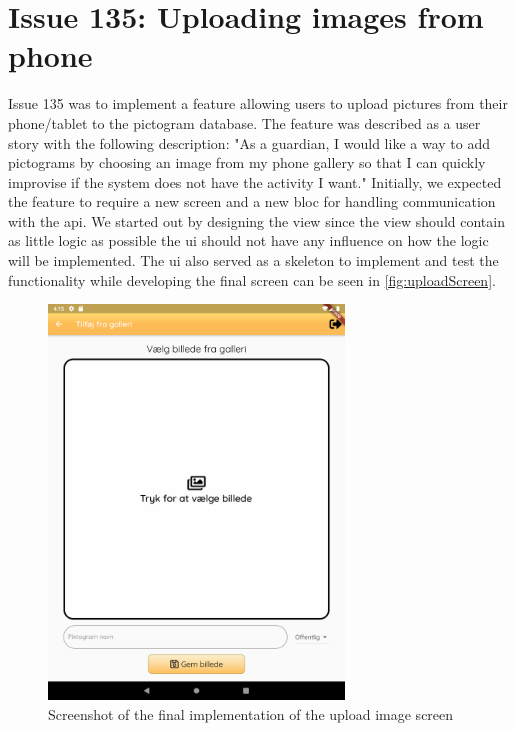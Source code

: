 \section{Issue 135: Uploading images from phone}

Issue 135 was to implement a feature allowing users to upload pictures from their phone/tablet to the pictogram database. The feature was described as a user story with the following description: "As a guardian, I would like a way to add pictograms by choosing an image from my phone gallery so that I can quickly improvise if the system does not have the activity I want."
Initially, we expected the feature to require a new screen and a new \gls{bloc} for handling communication with the api. We started out by designing the view since the view should contain as little logic as possible the \gls{ui} should not have any influence on how the logic will be implemented. The \gls{ui} also served as a skeleton to implement and test the functionality while developing the final screen can be seen in \autoref{fig:uploadScreen}.

\begin{figure}[!ht]
  \centering
  \includegraphics[width=0.7\textwidth]{figures/uploadPictogramScreen.png}
  \caption{Screenshot of the final implementation of the upload image screen}
  \label{fig:uploadScreen}
\end{figure}

